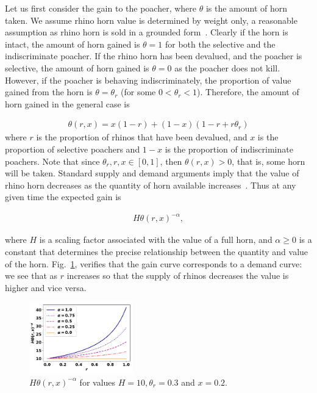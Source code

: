 \documentclass[10pt]{article}
\begin{document}
Let us first consider the gain to the poacher, where \(\theta\) is the amount of
horn taken. We assume rhino horn value is determined by weight only, a
reasonable assumption as rhino horn is sold in a grounded form~\cite{Saverhino}.
Clearly if the horn is intact, the amount of horn gained is \(\theta=1\) for
both the selective and the indiscriminate poacher.  If the rhino horn has been
devalued, and the poacher is selective, the amount of horn gained is
\(\theta=0\) as the poacher does not kill. However, if the poacher is behaving
indiscriminately, the proportion of value gained from the horn is \(\theta =
\theta_r\) (for some \(0<\theta_r<1\)). Therefore, the amount of horn gained in
the general case is

\begin{eqnarray}
    \label{eqn:theta}
    \theta(r, x) = x (1 - r) + (1 - x)(1-r+r\theta_r)
\end{eqnarray}
where \(r\) is the proportion of rhinos that have been devalued, and \(x\) is the
proportion of selective poachers and \(1-x\) is the proportion of indiscriminate
poachers. Note that since \(\theta_r, r, x  \in [0, 1]\), then
\(\theta(r, x) > 0\), that is, some horn will be taken. Standard supply and demand
arguments imply that the value
of rhino horn decreases as the quantity of horn available increases~\cite{mankiw2010}.
Thus at any given time the expected gain is

\begin{eqnarray}
    \label{eqn:individual_gain}
    H \theta(r, x)^{-\alpha},
\end{eqnarray}

where \(H\) is a scaling factor associated with the value of a full horn, and
\(\alpha \geq 0\) is a constant that determines the precise relationship between
the quantity and value of the horn.  Fig.~\ref{fig:GainCurve}, verifies that the
gain curve corresponds to a demand curve: we see that as \(r\) increases so that
the supply of rhinos decreases the value is higher and vice versa.

\begin{figure}[!htbp]
\centering
\includegraphics[width=0.4\textwidth]{images/gain_curve.pdf}
\caption{\label{fig:GainCurve} \(H \theta(r, x) ^{- \alpha}\) for values
\(H = 10, \theta_r = 0.3\) and \(x = 0.2.\)}
\end{figure}
\end{document}
